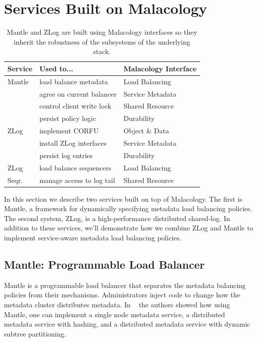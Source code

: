 \documentclass[preprint]{sigplanconf-eurosys}
\begin{document}
\section{Services Built on Malacology}
\label{sec:services}
\label{services-built-on-malacology}

\label{services}
\begin{table}
\centering
\begin{tabular}{  l | l | l }
\textbf{Service}              &
\textbf{Used to...}           &
\textbf{Malacology Interface} \\ \hline
Mantle & load balance metadata     & Load Balancing  \\
       & agree on current balancer & Service Metadata\\
       & control client write lock & Shared Resource \\
       & persist policy logic      & Durability      \\ \hline
ZLog   & implement CORFU           & Object \& Data  \\ 
       & install ZLog interfaces   & Service Metadata\\
       & persist log entries       & Durability      \\ \hline
ZLog   & load balance sequencers   & Load Balancing  \\
Seqr.  & manage access to log tail & Shared Resource \\ 
\end{tabular}
\caption{Mantle and ZLog are built using Malacology interfaces so they inherit the
robustness of the subsystems of the underlying stack.}
\label{table:implementation}
\end{table}

In this section we describe two services built on top of Malacology. The first
is Mantle, a framework for dynamically specifying metadata load balancing
policies. The second system, ZLog, is a high-performance distributed shared-log.
In addition to these services, we'll demonstrate how we combine ZLog and Mantle
to implement service-aware metadata load balancing policies.

\subsection{Mantle: Programmable Load Balancer}
\label{sec:mantle}

Mantle is a programmable load balancer that separates the metadata balancing
policies from their mechanisms. Administrators inject code to change how the
metadata cluster distributes metadata. In ~\cite{sevilla:sc15-mantle} the
authors showed how using Mantle, one can implement a single node metadata
service, a distributed metadata service with hashing, and a distributed
metadata service with dynamic subtree partitioning. 
\end{document}
